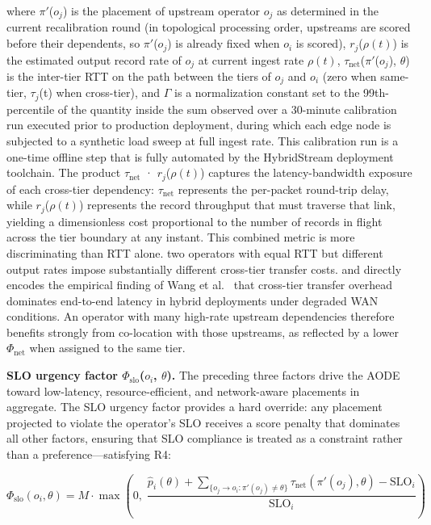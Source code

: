\documentclass[preprint,review,12pt]{elsarticle}
\begin{document}
where $\pi'$($o_j$) is the placement of upstream operator $o_j$ as determined in the current recalibration round (in topological processing order, upstreams are scored before their dependents, so $\pi'$($o_j$) is already fixed when $o_i$ is scored), $r_j$($\rho(t)$) is the estimated output record rate of $o_j$ at current ingest rate $\rho(t)$, $\tau_{\text{net}}$($\pi'$($o_j$), $\theta$) is the inter-tier RTT on the path between the tiers of $o_j$ and $o_i$ (zero when same-tier, $\tau_j$(t) when cross-tier), and $\Gamma$ is a normalization constant set to the 99th-percentile of the quantity inside the sum observed over a 30-minute calibration run executed prior to production deployment, during which each edge node is subjected to a synthetic load sweep at full ingest rate. This calibration run is a one-time offline step that is fully automated by the HybridStream deployment toolchain. The product $\tau_{\text{net}}$ · $r_j$($\rho(t)$) captures the latency-bandwidth exposure of each cross-tier dependency: $\tau_{\text{net}}$ represents the per-packet round-trip delay, while $r_j$($\rho(t)$) represents the record throughput that must traverse that link, yielding a dimensionless cost proportional to the number of records in flight across the tier boundary at any instant. This combined metric is more discriminating than RTT alone. two operators with equal RTT but different output rates impose substantially different cross-tier transfer costs. and directly encodes the empirical finding of Wang et al.~\cite{wang2022edgecloud} that cross-tier transfer overhead dominates end-to-end latency in hybrid deployments under degraded WAN conditions. An operator with many high-rate upstream dependencies therefore benefits strongly from co-location with those upstreams, as reflected by a lower $\Phi_{\text{net}}$ when assigned to the same tier.

\textbf{SLO urgency factor $\Phi_{\text{slo}}$($o_i$, $\theta$).} The preceding three factors drive the AODE toward low-latency, resource-efficient, and network-aware placements in aggregate. The SLO urgency factor provides a hard override: any placement projected to violate the operator's SLO receives a score penalty that dominates all other factors, ensuring that SLO compliance is treated as a constraint rather than a preference—satisfying R4:

\begin{equation}
\Phi_{\text{slo}}(o_i, \theta) = M \cdot \max\!\left(0,\; \frac{\hat{p}_i(\theta) + \sum_{\{o_j \to o_i : \pi'(o_j) \neq \theta\}} \tau_{\text{net}}(\pi'(o_j), \theta) - \text{SLO}_i}{\text{SLO}_i}\right)
\label{eq:phi-slo}
\end{equation}
\end{document}

